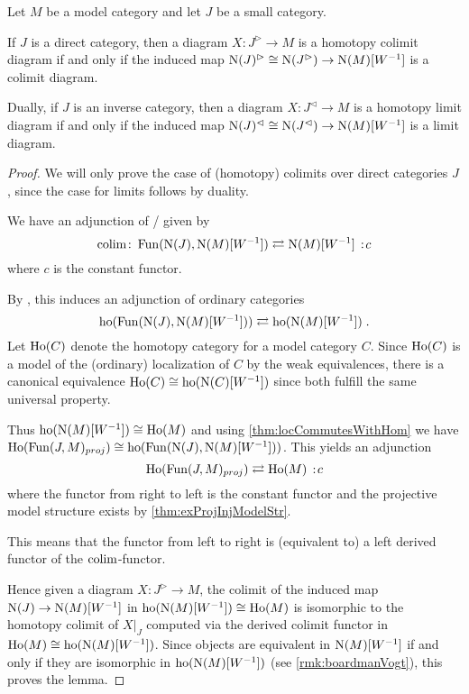 \begin{lemma}\label{lem:htpyLimAndColimAgree}
    Let $M$ be a model category and let $J$ be a small category.
    
    If $J$ is a direct category, then a diagram $X\colon J^{\rhd}\to M$ is a homotopy colimit diagram if and only if the induced map $\operatorname{N}(J)^{\rhd}\cong\operatorname{N}(J^{\rhd})\to\operatorname{N}(M)[W^{-1}]$ is a colimit diagram.

    Dually, if $J$ is an inverse category, then a diagram $X\colon J^{\lhd}\to M$ is a homotopy limit diagram if and only if the induced map $\operatorname{N}(J)^{\lhd}\cong\operatorname{N}(J^{\lhd})\to\operatorname{N}(M)[W^{-1}]$ is a limit diagram.
    \begin{proof}
        We will only prove the case of (homotopy) colimits over direct categories $J$, since the case for limits follows by duality.

        We have an adjunction of \inftycats/ given by 
        \begin{equation*}
            \colim\colon\Fun(\N(J),\N(M)[W^{-1}])\rightleftarrows\N(M)[W^{-1}]\mkern+3mu:\mkern-3mu c
        \end{equation*}
        where $c$ is the constant functor.

        By \cite[Remark 6.1.5]{cisinski_2019}, this induces an adjunction of ordinary categories
        \begin{equation*}
            \operatorname{ho}(\operatorname{Fun}(\operatorname{N}(J),\operatorname{N}(M)[W^{-1}]))\rightleftarrows\operatorname{ho}(\operatorname{N}(M)[W^{-1}])\;.
        \end{equation*}
        Let $\operatorname{Ho}(C)$ denote the homotopy category for a model category $C$. 
        Since $\operatorname{Ho}(C)$ is a model of the (ordinary) localization of $C$ by the weak equivalences, there is a canonical equivalence $\operatorname{Ho}(C)\cong\operatorname{ho}(\operatorname{N}(C)[W^{-1}])$ since both fulfill the same universal property.
        
        Thus $\operatorname{ho}(\operatorname{N}(M)[W^{-1}])\cong\operatorname{Ho}(M)$ and using \cref{thm:locCommutesWithHom} we have $\operatorname{Ho}(\operatorname{Fun}(J,M)_{proj})\cong\operatorname{ho}(\operatorname{Fun}(\operatorname{N}(J),\operatorname{N}(M)[W^{-1}]))$.
        This yields an adjunction
        \begin{equation*}
            \Ho(\Fun(J,M)_{proj})\rightleftarrows\Ho(M)\mkern+3mu:\mkern-3mu c
        \end{equation*}
        where the functor from right to left is the constant functor and the projective model structure exists by \cref{thm:exProjInjModelStr}.

        This means that the functor from left to right is (equivalent to) a left derived functor of the $\operatorname*{colim}$-functor.

        Hence given a diagram $X\colon J^{\rhd}\to M$, the colimit of the induced map $\operatorname{N}(J)\to\operatorname{N}(M)[W^{-1}]$ in $\operatorname{ho}(\operatorname{N}(M)[W^{-1}])\cong\operatorname{Ho}(M)$ is isomorphic to the homotopy colimit of $X|_J$ computed via the derived colimit functor in $\operatorname{Ho}(M)\cong\operatorname{ho}(\operatorname{N}(M)[W^{-1}])$.
        Since objects are equivalent in $\operatorname{N}(M)[W^{-1}]$ if and only if they are isomorphic in $\operatorname{ho}(\operatorname{N}(M)[W^{-1}])$ (see \cref{rmk:boardmanVogt}), this proves the lemma. 
    \end{proof}
\end{lemma}
